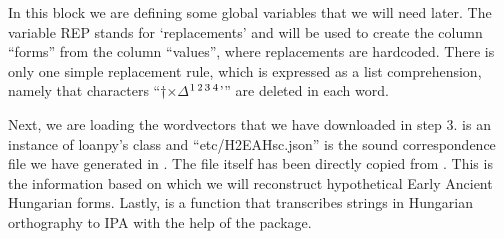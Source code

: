 \documentclass[letterpaper,10pt,english]{sphinxmanual}
\begin{document}
\begin{sphinxVerbatim}[commandchars=\\\{\}]
  \PYG{p}{[}     \PYG{p}{]}
  
  
  
\end{sphinxVerbatim}

\sphinxAtStartPar
In this block we are defining some global variables that we will need later.
The variable REP stands for ‘replacements’ and will be used to create
the column “forms” from the column “values”, where replacements are hard\sphinxhyphen{}coded.
There is only one simple replacement rule, which is expressed as a list
comprehension, namely that characters “†×\(\Delta \)\sphinxhyphen{}\(\sp{\text{1}}\)\(\sp{\text{2}}\)\(\sp{\text{3}}\)\(\sp{\text{4}}\)’” are deleted in each
word.

\sphinxAtStartPar
Next, we are loading the word\sphinxhyphen{}vectors that we have downloaded in step 3.
 is an instance of
loanpy’s 
class and “etc/H2EAHsc.json” is the sound correspondence file
we have generated in .
The file itself has been directly copied from
. This is the information based
on which we will reconstruct hypothetical Early Ancient Hungarian forms.
Lastly,  is a function that transcribes strings in Hungarian
orthography to IPA with the help of the  package.

\begin{sphinxVerbatim}[commandchars=\\\{\}]
 
      
      
      
\end{sphinxVerbatim}
\end{document}
